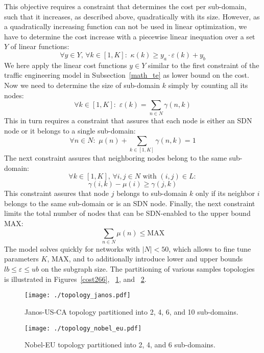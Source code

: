 \documentclass[journal]{IEEEtran}
\begin{document}
This objective requires a constraint that determines the cost per sub-domain, such that it increases, as described above, quadratically with its size. However, as a quadratically increasing function can not be used in linear optimization, we have to determine the cost increase with a piecewise linear inequation over a set $Y$ of linear functions:
\[
\forall y\in Y, \, \forall k\in [1,K]: \,\, \kappa(k) \geq y_a\cdot \varepsilon(k) +y_b
\]
We here apply the linear cost functions $y\in Y$ similar to the first constraint of the traffic engineering model in Subsection~\ref{math_te} as lower bound on the cost. Now we need to determine the size of sub-domain $k$ simply by counting all its nodes:
\[
\forall k\in [1,K]: \,\, \varepsilon(k) = \sum_{n\in N} \gamma(n,k)
\]
This in turn requires a constraint that assures that each node is either an SDN node or it belongs to a single sub-domain:
\[
\forall n\in N: \,\,
\mu(n) + \sum_{k\in[1,K]} \gamma(n,k) = 1
\]
The next constraint assures that neighboring nodes belong to the same sub-domain:
\[
\forall k\in [1,K], \, \forall i,j\in N \text{ with } (i,j) \in L:
\]
\[
\gamma(i,k) - \mu(i) \geq \gamma(j,k)
\]
This constraint assures that node $j$ belongs to sub-domain $k$ only if its neighbor $i$ belongs to the same sub-domain or is an SDN node. Finally, the next constraint limits the total number of nodes that can be SDN-enabled to the upper bound $\text{MAX}$:
\[
\sum_{n\in N} \mu(n) \leq \text{MAX}
\]
The model solves quickly for networks with $|N|<50$, which allows to fine tune parameters $K$, $\text{MAX}$, and to additionally introduce lower and upper bounds $lb \leq \varepsilon \leq ub$ on the subgraph size. The partitioning of various samples topologies is illustrated in Figures~\ref{cost266}, ~\ref{janos}, and ~\ref{nobel}.

\begin{figure}[t] \center
\texttt{[image: ./topology\_janos.pdf]}
\caption{Janos-US-CA topology partitioned into 2, 4, 6, and 10 sub-domains.}
\label{janos} \end{figure}

\begin{figure}[t] \center
\texttt{[image: ./topology\_nobel\_eu.pdf]}
\caption{Nobel-EU topology partitioned into 2, 4, and 6 sub-domains.}
\label{nobel} \end{figure}
\end{document}
